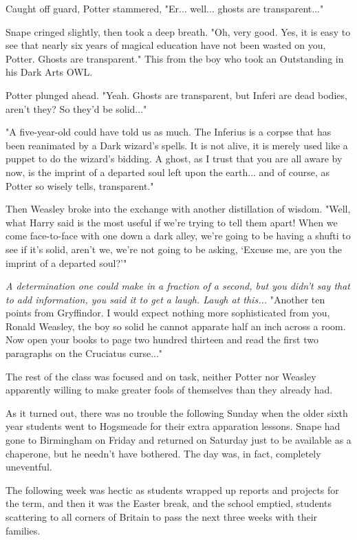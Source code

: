 Caught off guard, Potter stammered, "Er... well... ghosts are transparent..."

Snape cringed slightly, then took a deep breath. "Oh, very good. Yes, it is easy to see that nearly six years of magical education have not been wasted on you, Potter. Ghosts are transparent." This from the boy who took an Outstanding in his Dark Arts OWL.

Potter plunged ahead. "Yeah. Ghosts are transparent, but Inferi are dead bodies, aren't they? So they'd be solid..."

"A five-year-old could have told us as much. The Inferius is a corpse that has been reanimated by a Dark wizard's spells. It is not alive, it is merely used like a puppet to do the wizard's bidding. A ghost, as I trust that you are all aware by now, is the imprint of a departed soul left upon the earth... and of course, as Potter so wisely tells, transparent."

Then Weasley broke into the exchange with another distillation of wisdom. "Well, what Harry said is the most useful if we're trying to tell them apart! When we come face-to-face with one down a dark alley, we're going to be having a shufti to see if it's solid, aren't we, we're not going to be asking, `Excuse me, are you the imprint of a departed soul?'"

\emph{A determination one could make in a fraction of a second, but you didn't say that to add information, you said it to get a laugh. Laugh at this...} "Another ten points from Gryffindor. I would expect nothing more sophisticated from you, Ronald Weasley, the boy so solid he cannot apparate half an inch across a room. Now open your books to page two hundred thirteen and read the first two paragraphs on the Cruciatus curse..."

The rest of the class was focused and on task, neither Potter nor Weasley apparently willing to make greater fools of themselves than they already had.

As it turned out, there was no trouble the following Sunday when the older sixth year students went to Hogsmeade for their extra apparation lessons. Snape had gone to Birmingham on Friday and returned on Saturday just to be available as a chaperone, but he needn't have bothered. The day was, in fact, completely uneventful.

The following week was hectic as students wrapped up reports and projects for the term, and then it was the Easter break, and the school emptied, students scattering to all corners of Britain to pass the next three weeks with their families.

